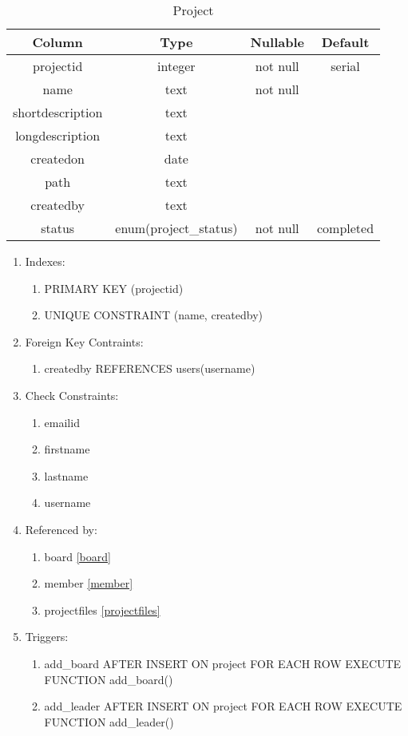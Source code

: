 \documentclass[conference,onecolumn]{IEEEtran}
\begin{document}
\begin{table}[htbp]
  \caption{Project}
  \begin{center}
    \begin{tabular}{|c|c|c|c|}
      \hline
      \textbf{Column} & \textbf{Type} & \textbf{Nullable} & \textbf{Default}\\
      \hline
      projectid & integer & not null & serial\\
      name & text & not null &\\
      shortdescription & text &&\\
      longdescription & text &&\\
      createdon & date &&\\
      path & text &&\\
      createdby & text &&\\
      status & enum(project\_status) & not null & completed\\
      \hline
    \end{tabular}
    \begin{enumerate}
    \item Indexes:
      \begin{enumerate}
      \item PRIMARY KEY (projectid)
      \item UNIQUE CONSTRAINT (name, createdby)
      \end{enumerate}
    \item Foreign Key Contraints:
      \begin{enumerate}
        \item createdby REFERENCES users(username)
      \end{enumerate}
    \item Check Constraints:
      \begin{enumerate}
      \item emailid
      \item firstname
      \item lastname
      \item username
      \end{enumerate}
    \item Referenced by:
      \begin{enumerate}
      \item board \ref{board}
      \item member \ref{member}
      \item projectfiles \ref{projectfiles}
      \end{enumerate}
    \item Triggers:
      \begin{enumerate}
        \item add\_board AFTER INSERT ON project FOR EACH ROW EXECUTE FUNCTION add\_board()
        \item add\_leader AFTER INSERT ON project FOR EACH ROW EXECUTE FUNCTION add\_leader()
      \end{enumerate}
    \end{enumerate}
    \label{project}
  \end{center}
\end{table}
\end{document}
